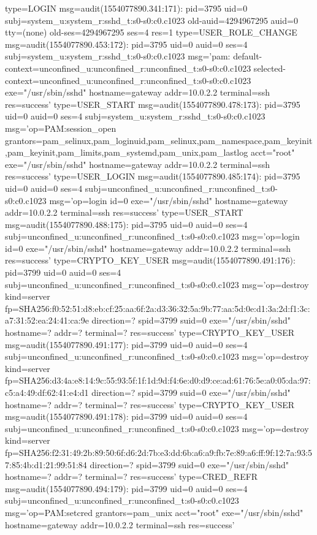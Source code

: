 \documentclass[]{report}
\newenvironment{Shaded}{}{}
\newcommand{\NormalTok}[1]{#1}
\begin{document}
\begin{Shaded}
\begin{Highlighting}[]
\NormalTok{type=LOGIN msg=audit(1554077890.341:171): pid=3795 uid=0 subj=system_u:system_r:sshd_t:s0-s0:c0.c1023 old-auid=4294967295 auid=0 tty=(none) old-ses=4294967295 ses=4 res=1}
\NormalTok{type=USER_ROLE_CHANGE msg=audit(1554077890.453:172): pid=3795 uid=0 auid=0 ses=4 subj=system_u:system_r:sshd_t:s0-s0:c0.c1023 msg='pam: default-context=unconfined_u:unconfined_r:unconfined_t:s0-s0:c0.c1023 selected-context=unconfined_u:unconfined_r:unconfined_t:s0-s0:c0.c1023 exe="/usr/sbin/sshd" hostname=gateway addr=10.0.2.2 terminal=ssh res=success'}
\NormalTok{type=USER_START msg=audit(1554077890.478:173): pid=3795 uid=0 auid=0 ses=4 subj=system_u:system_r:sshd_t:s0-s0:c0.c1023 msg='op=PAM:session_open grantors=pam_selinux,pam_loginuid,pam_selinux,pam_namespace,pam_keyinit,pam_keyinit,pam_limits,pam_systemd,pam_unix,pam_lastlog acct="root" exe="/usr/sbin/sshd" hostname=gateway addr=10.0.2.2 terminal=ssh res=success'}
\NormalTok{type=USER_LOGIN msg=audit(1554077890.485:174): pid=3795 uid=0 auid=0 ses=4 subj=unconfined_u:unconfined_r:unconfined_t:s0-s0:c0.c1023 msg='op=login id=0 exe="/usr/sbin/sshd" hostname=gateway addr=10.0.2.2 terminal=ssh res=success'}
\NormalTok{type=USER_START msg=audit(1554077890.488:175): pid=3795 uid=0 auid=0 ses=4 subj=unconfined_u:unconfined_r:unconfined_t:s0-s0:c0.c1023 msg='op=login id=0 exe="/usr/sbin/sshd" hostname=gateway addr=10.0.2.2 terminal=ssh res=success'}
\NormalTok{type=CRYPTO_KEY_USER msg=audit(1554077890.491:176): pid=3799 uid=0 auid=0 ses=4 subj=unconfined_u:unconfined_r:unconfined_t:s0-s0:c0.c1023 msg='op=destroy kind=server fp=SHA256:f0:52:51:d8:eb:cf:25:aa:6f:2a:d3:36:32:5a:9b:77:aa:5d:0e:d1:3a:2d:f1:3c:a7:31:52:ea:24:41:ca:9e direction=? spid=3799 suid=0  exe="/usr/sbin/sshd" hostname=? addr=? terminal=? res=success'}
\NormalTok{type=CRYPTO_KEY_USER msg=audit(1554077890.491:177): pid=3799 uid=0 auid=0 ses=4 subj=unconfined_u:unconfined_r:unconfined_t:s0-s0:c0.c1023 msg='op=destroy kind=server fp=SHA256:d3:4a:e8:14:9c:55:93:5f:1f:1d:9d:f4:6e:d0:d9:ce:ad:61:76:5e:a0:05:da:97:c5:a4:49:df:62:41:e4:d1 direction=? spid=3799 suid=0  exe="/usr/sbin/sshd" hostname=? addr=? terminal=? res=success'}
\NormalTok{type=CRYPTO_KEY_USER msg=audit(1554077890.491:178): pid=3799 uid=0 auid=0 ses=4 subj=unconfined_u:unconfined_r:unconfined_t:s0-s0:c0.c1023 msg='op=destroy kind=server fp=SHA256:f2:31:49:2b:89:50:6f:d6:2d:7b:e3:dd:6b:a6:a9:fb:7e:89:a6:ff:9f:12:7a:93:57:85:4b:d1:21:99:51:84 direction=? spid=3799 suid=0  exe="/usr/sbin/sshd" hostname=? addr=? terminal=? res=success'}
\NormalTok{type=CRED_REFR msg=audit(1554077890.494:179): pid=3799 uid=0 auid=0 ses=4 subj=unconfined_u:unconfined_r:unconfined_t:s0-s0:c0.c1023 msg='op=PAM:setcred grantors=pam_unix acct="root" exe="/usr/sbin/sshd" hostname=gateway addr=10.0.2.2 terminal=ssh res=success'}

\end{Highlighting}
\end{Shaded}
\end{document}
